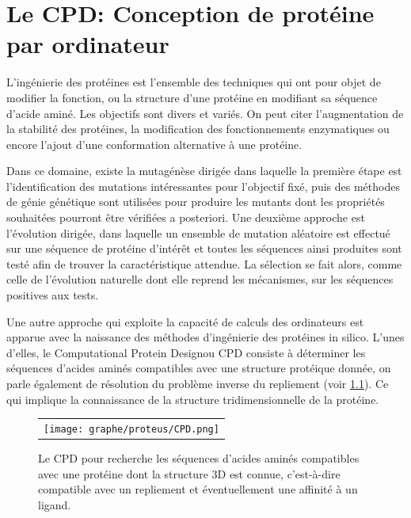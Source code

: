 
\chapter{Le \og CPD\fg: Conception de protéine par ordinateur}
\label{chap:CPD}

L'ingénierie des protéines est l'ensemble des techniques qui ont pour objet de modifier la fonction, ou la structure d'une protéine en modifiant sa séquence d'acide aminé. Les objectifs sont divers et variés. On peut citer l'augmentation de la stabilité des protéines, la  modification des fonctionnements enzymatiques ou encore l'ajout d'une conformation alternative à une protéine.

Dans ce domaine, existe la mutagénèse dirigée dans laquelle la première étape est l'identification des mutations intéressantes pour l'objectif fixé, puis des méthodes de génie génétique sont utilisées pour produire les mutants dont les propriétés souhaitées pourront être vérifiées a posteriori. Une deuxième approche est l'évolution dirigée, dans laquelle un ensemble de mutation aléatoire est effectué sur une séquence de protéine d'intérêt et toutes les séquences ainsi produites sont testé afin de trouver la caractéristique attendue. La sélection se fait alors, comme celle de l'évolution naturelle dont elle reprend les mécanismes, sur les séquences positives aux tests.



Une autre approche qui exploite la capacité de calculs des ordinateurs est apparue avec la naissance des méthodes d'ingénierie des protéines \og in silico\fg. L'unes d'elles, le \og Computational Protein Design\fg ou CPD consiste à déterminer les séquences d'acides aminés compatibles avec une structure protéique donnée, on parle également de résolution du problème inverse du repliement (voir \ref{graph:CPD}). Ce qui implique la connaissance de la structure tridimensionnelle de la protéine. 

   \begin{figure}[!htbp]
     \centering
     \begin{tabular}{c}
       \texttt{[image: graphe/proteus/CPD.png]} &
     \end{tabular}
     
     \caption{Le CPD pour \og {}\fg recherche les séquences d'acides aminés compatibles avec une protéine dont la structure 3D  est connue, c'est-à-dire compatible avec un repliement et éventuellement une affinité à un ligand.}
\label{graph:CPD}
   \end{figure}


